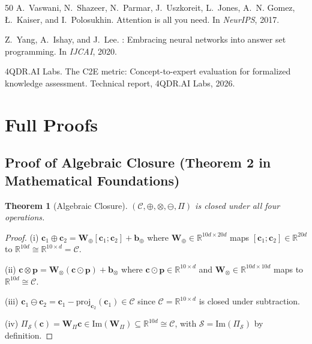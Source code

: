\documentclass{article}
\newtheorem{theorem}{Theorem}
\newcommand{\R}{\mathbb{R}}
\newcommand{\cC}{\mathcal{C}}
\newcommand{\cS}{\mathcal{S}}
\newcommand{\bW}{\mathbf{W}}
\newcommand{\bc}{\mathbf{c}}
\newcommand{\bp}{\mathbf{p}}
\begin{document}
\begin{thebibliography}{50}
A.~Vaswani, N.~Shazeer, N.~Parmar, J.~Uszkoreit, L.~Jones, A.~N. Gomez,
  {\L}.~Kaiser, and I.~Polosukhin.
\newblock Attention is all you need.
\newblock In \emph{NeurIPS}, 2017.

Z.~Yang, A.~Ishay, and J.~Lee.
: Embracing neural networks into answer set programming.
\newblock In \emph{IJCAI}, 2020.

{4QDR.AI Labs}.
\newblock The {C2E} metric: Concept-to-expert evaluation for formalized
  knowledge assessment.
\newblock Technical report, 4QDR.AI Labs, 2026.

\end{thebibliography}

\appendix

\section{Full Proofs}

\subsection{Proof of Algebraic Closure (Theorem 2 in Mathematical Foundations)}

\begin{theorem}[Algebraic Closure]
$(\cC, \oplus, \otimes, \ominus, \Pi)$ is closed under all four operations.
\end{theorem}

\begin{proof}
(i) $\bc_1 \oplus \bc_2 = \bW_\oplus [\bc_1; \bc_2] + \mathbf{b}_\oplus$ where $\bW_\oplus \in \R^{10d \times 20d}$ maps $[\bc_1; \bc_2] \in \R^{20d}$ to $\R^{10d} \cong \R^{10 \times d} = \cC$.

(ii) $\bc \otimes \bp = \bW_\otimes(\bc \odot \bp) + \mathbf{b}_\otimes$ where $\bc \odot \bp \in \R^{10 \times d}$ and $\bW_\otimes \in \R^{10d \times 10d}$ maps to $\R^{10d} \cong \cC$.

(iii) $\bc_1 \ominus \bc_2 = \bc_1 - \text{proj}_{\bc_2}(\bc_1) \in \cC$ since $\cC = \R^{10 \times d}$ is closed under subtraction.

(iv) $\Pi_\cS(\bc) = \bW_\Pi \bc \in \text{Im}(\bW_\Pi) \subseteq \R^{10d} \cong \cC$, with $\cS = \text{Im}(\Pi_\cS)$ by definition.
\end{proof}
\end{document}
